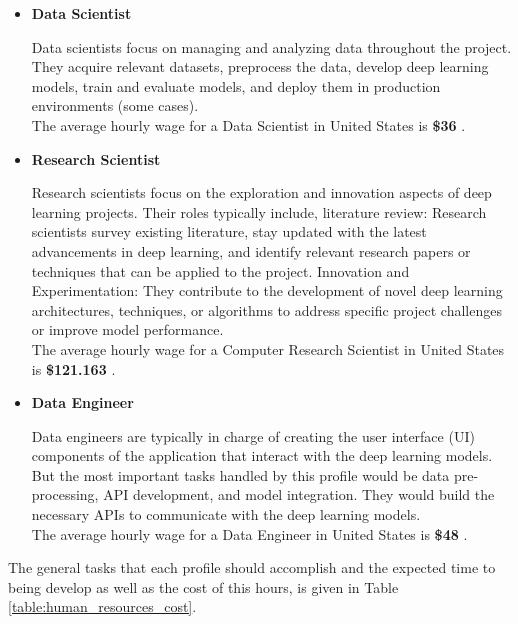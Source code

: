 \begin{itemize}
  \item \textbf{Data Scientist}

    Data scientists focus on managing and analyzing data throughout the
    project. They acquire relevant datasets, preprocess the data, develop deep
    learning models, train and evaluate models, and deploy them in production
    environments (some cases). \\

    The average hourly wage for a Data Scientist in United States is
    \textbf{\$36} \cite{SalaryDataScientist}. \\

  \item \textbf{Research Scientist}

    Research scientists focus on the exploration and innovation aspects of deep
    learning projects. Their roles typically include, literature review:
    Research scientists survey existing literature, stay updated with the
    latest advancements in deep learning, and identify relevant research papers
    or techniques that can be applied to the project. Innovation and
    Experimentation: They contribute to the development of novel deep learning
    architectures, techniques, or algorithms to address specific project
    challenges or improve model performance. \\

    The average hourly wage for a Computer Research Scientist in United States
    is \textbf{\$121.163} \cite{SalaryResearchScientist}. \\

  \item \textbf{Data Engineer}

    Data engineers are typically in charge of creating the user interface (UI)
    components of the application that interact with the deep learning models.
    But the most important tasks handled by this profile would be data
    pre-processing, API development, and model integration. They would build
    the necessary APIs to communicate with the deep learning models. \\

    The average hourly wage for a Data Engineer in United States is
    \textbf{\$48} \cite{SalaryDataEnginner}. \\

\end{itemize}

The general tasks that each profile should accomplish and the expected time to
being develop as well as the cost of this hours, is given in Table
\ref{table:human_resources_cost}.

